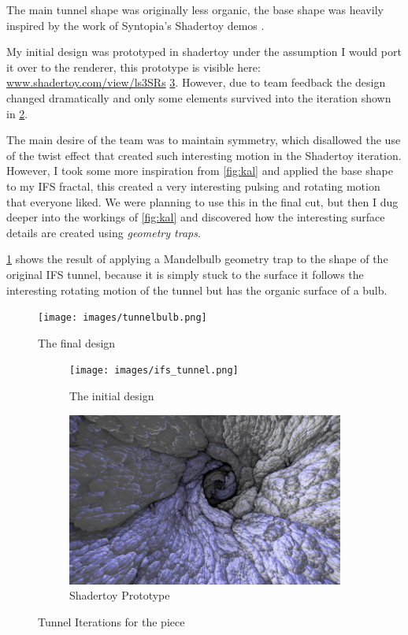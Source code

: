 \documentclass[11pt,a4paper,final,notitlepage]{report}
\begin{document}
The main tunnel shape was originally less organic, the base shape was heavily inspired by the work of Syntopia's Shadertoy demos \cite{mengerjourney} \cite{kaljourney}. 

My initial design was prototyped in shadertoy under the assumption I would port it over to the renderer, this prototype is visible here: \url{www.shadertoy.com/view/ls3SRs} \ref{fig:shadertoy}. However, due to team feedback the design changed dramatically and only some elements survived into the iteration shown in \ref{fig:initialdesign}.


The main desire of the team was to maintain symmetry, which disallowed the use of the twist effect that created such interesting motion in the Shadertoy iteration. However, I took some more inspiration from \ref{fig:kal} and applied the base shape to my IFS fractal, this created a very interesting pulsing and rotating motion that everyone liked. We were planning to use this in the final cut, but then I dug deeper into the workings of \ref{fig:kal} and discovered how the interesting surface details are created using \textit{geometry traps}.

\ref{fig:finaldesign} shows the result of applying a Mandelbulb geometry trap to the shape of the original IFS tunnel, because it is simply stuck to the surface it follows the interesting rotating motion of the tunnel but has the organic surface of a bulb.

\begin{figure}
\begin{center}
  \texttt{[image: images/tunnelbulb.png]}
  \caption{The final design}
  \label{fig:finaldesign}
\end{center}
\end{figure}


\begin{figure}
\centering
\begin{subfigure}{.5\textwidth}
  \centering
  \texttt{[image: images/ifs\_tunnel.png]}
  \caption{The initial design}
  \label{fig:initialdesign}
\end{subfigure}%
\begin{subfigure}{.5\textwidth}
  \centering
  \includegraphics[width=\textwidth]{images/shadertoy_test}
\caption{Shadertoy Prototype}
\label{fig:shadertoy}
\end{subfigure}
\caption{Tunnel Iterations for the piece}
\label{fig:test}
\end{figure}
\end{document}
